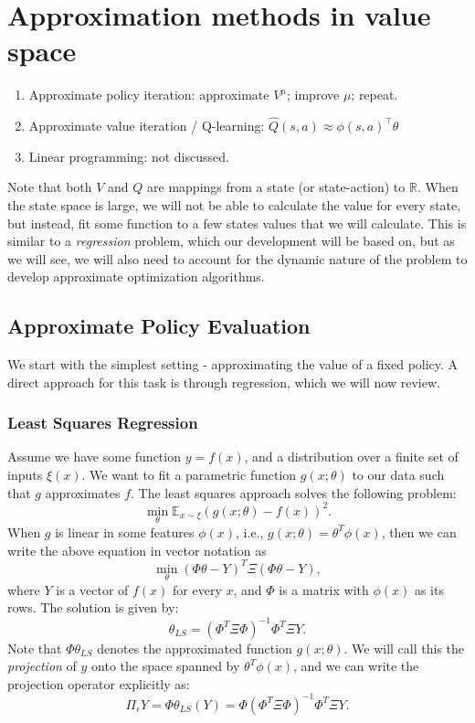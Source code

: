 \section{Approximation methods in value space}
\begin{enumerate}
\item Approximate policy iteration: approximate $V^\mu$; improve $\mu$; repeat.
\item Approximate value iteration / Q-learning: $\hat{Q}(s,a)\approx {\phi}(s,a)^\top {\theta}$
\item Linear programming: not discussed.
\end{enumerate}

Note that both $V$ and $Q$ are mappings from a state (or state-action) to $\mathbb{R}$. When the state space is large, we will not be able to calculate the value for every state, but instead, fit some function to a few states values that we will calculate. This is similar to a \emph{regression} problem, which our development will be based on, but as we will see, we will also need to account for the dynamic nature of the problem to develop approximate optimization algorithms.

\subsection{Approximate Policy Evaluation}

We start with the simplest setting - approximating the value of a fixed policy. A direct approach for this task is through regression, which we will now review. 

\subsubsection{Least Squares Regression}
Assume we have some function $y = f(x)$, and a distribution over a finite set of inputs $\xi(x)$. 
We want to fit a parametric function $g(x;\theta)$ to our data such that $g$ approximates $f$. The least squares approach solves the following problem:
$$
\min_\theta \mathbb{E}_{x\sim\xi} (g(x;\theta) - f(x))^2.
$$
When $g$ is linear in some features $\phi(x)$, i.e., $g(x;\theta) = \theta^T \phi(x)$, then we can write the above equation in vector notation as
$$
\min_\theta (\Phi \theta - Y)^T \Xi (\Phi \theta - Y),
$$
where $Y$ is a vector of $f(x)$ for every $x$, and $\Phi$ is a matrix with $\phi(x)$ as its rows. The solution is given by:
$$
\theta_{LS} = (\Phi^T \Xi \Phi)^{-1} \Phi^T \Xi Y.
$$
Note that $\Phi \theta_{LS}$ denotes the approximated function $g(x;\theta)$. We will call this the \emph{projection} of $y$ onto the space spanned by $\theta^T \phi(x)$, and we can write the projection operator explicitly as:
$$
\Pi_\epsilon Y = \Phi \theta_{LS}(Y) = \Phi (\Phi^T \Xi \Phi)^{-1} \Phi^T \Xi Y.
$$

